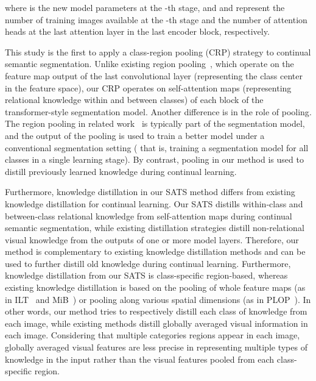 \documentclass[onecolumn,conference,compsoc]{IEEEtran}
\begin{document}
\begin{spacing}{1.5}
\noindent where  is the new model parameters at the -th stage, and  and  represent the number of training images available at the -th stage and the number of attention heads at the last attention layer in the last encoder block,  {respectively.}

{This study is the} first to apply a class-region pooling (CRP) strategy to continual semantic segmentation.  {Unlike} existing region pooling~\cite{ACFNet, CRP_1, CRP_2}, which  {operate on the} feature map output of the last convolutional layer (representing the class center in the feature space), our CRP operates on self-attention maps (representing relational knowledge within and between classes) of each block of the transformer-style segmentation model. Another difference is in the {role of pooling}. The region pooling in related work~\cite{ACFNet, CRP_1, CRP_2}  is  {typically} part of the segmentation model, and the output of the pooling is used to train a better model under a  {conventional} segmentation setting ( {that is, training} a segmentation model for all classes in a single learning stage).  {By contrast,} pooling in our method is used to distill previously learned knowledge during continual learning.


 {Furthermore,} knowledge distillation in our SATS method  {differs} from existing knowledge distillation for continual learning. Our SATS  {distills} within-class and between-class relational knowledge from self-attention maps during continual semantic segmentation, while existing distillation strategies distill non-relational visual knowledge from the outputs of one or more model layers. Therefore, our method is complementary to existing knowledge distillation methods and can be used to further distill old knowledge during continual learning. Furthermore, knowledge distillation from our SATS is class-specific region-based,  {whereas} existing knowledge distillation is based on the pooling of whole feature maps (as in ILT~\cite{ILT} and MiB~\cite{MiB}) or pooling along various spatial dimensions (as in PLOP~\cite{PLOP}).  In other words, our method tries to respectively distill each class of knowledge from each image, while existing methods distill globally averaged visual information in each image. Considering that multiple categories regions appear in each image, globally averaged visual features are less precise in representing multiple types of knowledge in the input  {rather} than the visual features pooled from each class-specific region.



\end{spacing}
\end{document}
